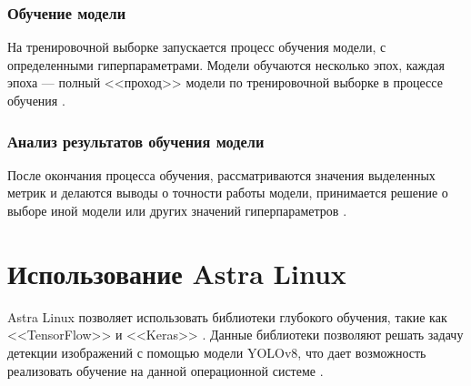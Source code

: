 \subsubsection{Обучение модели}
На тренировочной выборке запускается процесс обучения модели, с определенными гиперпараметрами. Модели обучаются несколько эпох, каждая эпоха --- полный 
<<проход>> модели по тренировочной выборке в процессе обучения \cite{epoch}.

\subsubsection{Анализ результатов обучения модели}
После окончания процесса обучения, рассматриваются значения  выделенных метрик и делаются выводы  о точности работы модели, принимается
решение о выборе иной модели или других значений гиперпараметров \cite{learning}.

\section{Использование Astra Linux}
Astra Linux позволяет использовать библиотеки глубокого обучения, такие как <<TensorFlow>> и <<Keras>> \cite{astra_linux}. Данные библиотеки позволяют
решать задачу детекции изображений с помощью модели YOLOv8, что дает возможность реализовать обучение на данной операционной системе \cite{keras_yolov8}.











